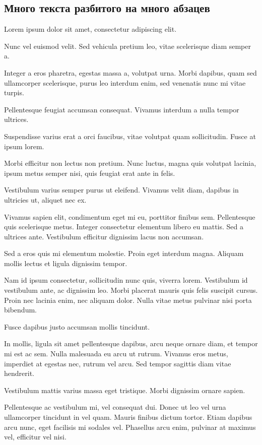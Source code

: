 \subsection{Много текста разбитого на много абзацев}\label{subsec:chapter_2/section_1/subsection_5}

Lorem ipsum dolor sit amet, consectetur adipiscing elit.

Nunc vel euismod velit. Sed vehicula pretium leo, vitae scelerisque diam semper a.

Integer a eros pharetra, egestas massa a, volutpat urna. Morbi dapibus, quam sed ullamcorper scelerisque, purus leo interdum enim, sed venenatis nunc mi vitae turpis.

Pellentesque feugiat accumsan consequat. Vivamus interdum a nulla tempor ultrices.

Suspendisse varius erat a orci faucibus, vitae volutpat quam sollicitudin. Fusce at ipsum lorem.

Morbi efficitur non lectus non pretium. Nunc luctus, magna quis volutpat lacinia, ipsum metus semper nisi, quis feugiat erat ante in felis.

Vestibulum varius semper purus ut eleifend. Vivamus velit diam, dapibus in ultricies ut, aliquet nec ex.

Vivamus sapien elit, condimentum eget mi eu, porttitor finibus sem. Pellentesque quis scelerisque metus. Integer consectetur elementum libero eu mattis. Sed a ultrices ante. Vestibulum efficitur dignissim lacus non accumsan.

Sed a eros quis mi elementum molestie. Proin eget interdum magna. Aliquam mollis lectus et ligula dignissim tempor.

Nam id ipsum consectetur, sollicitudin nunc quis, viverra lorem. Vestibulum id vestibulum ante, ac dignissim leo. Morbi placerat mauris quis felis suscipit cursus. Proin nec lacinia enim, nec aliquam dolor. Nulla vitae metus pulvinar nisi porta bibendum.

Fusce dapibus justo accumsan mollis tincidunt.

In mollis, ligula sit amet pellentesque dapibus, arcu neque ornare diam, et tempor mi est ac sem. Nulla malesuada eu arcu ut rutrum. Vivamus eros metus, imperdiet at egestas nec, rutrum vel arcu. Sed tempor sagittis diam vitae hendrerit.

Vestibulum mattis varius massa eget tristique. Morbi dignissim ornare sapien.

Pellentesque ac vestibulum mi, vel consequat dui. Donec ut leo vel urna ullamcorper tincidunt in vel quam. Mauris finibus dictum tortor. Etiam dapibus arcu nunc, eget facilisis mi sodales vel. Phasellus arcu enim, pulvinar at maximus vel, efficitur vel nisi.

